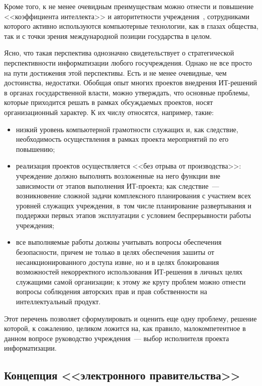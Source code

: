 \begin{multicols}{2}
Кроме того, к не менее очевидным преимуществам можно отнести и повышение
<<коэффициента интеллекта>> и авторитетности учреждения~\cite{1bos}, сотрудниками
которого активно используются компьютерные технологии, как в глазах общества, так и с
точки зрения международной позиции государства в целом.

Ясно, что такая перспектива однозначно свидетельствует о стратегической
перспективности информатизации любого госучреждения. Однако не все просто на пути
достижения этой перспективы. Есть и не менее очевидные, чем достоинства, недостатки.
Обобщая опыт многих проектов внедрения ИТ-решений в органах государственной
влас\-ти, можно утверждать, что основные проблемы, которые приходится решать в рамках
обсуждаемых проектов, носят организационный характер. К их числу относятся,
например, такие:
\begin{itemize}
\item низкий уровень компьютерной грамотности служащих и, как следствие,
необходимость осуществления в рамках проекта мероприятий по его повышению;
\item реализация проектов осуществляется <<без отрыва от производства>>:
учреждение должно выполнять возложенные на него функции вне зависимости от
этапов выполнения ИТ-проекта; как следствие~--- возникновение сложной задачи
комплексного планирования с участием всех уровней служащих учреждения, в~том
чис\-ле планирование развертывания и поддержки первых этапов эксплуатации с условием
бес\-пре\-рыв\-ности работы учреждения;
\item все выполняемые работы должны учитывать вопросы обеспечения безопасности,
причем не только в целях обеспечения зашиты от не\-санк\-ци\-о\-ни\-ро\-ван\-но\-го доступа
извне, но и в \mbox{целях} блокирования возможностей некорректного использования 
ИТ-ре\-ше\-ния в личных целях служащими самой организации; к этому же кругу проблем 
можно отнести вопросы соблюдения авторских прав и прав соб\-ст\-вен\-ности на 
интеллектуальный продукт.
\end{itemize}

Этот перечень позволяет сформулировать и оценить еще одну проблему, решение
которой, к сожа\-ле\-нию, целиком ложится на, как правило, малокомпетентное в данном
вопросе руководство учреж\-де\-ния~--- выбор исполнителя проекта информатизации.

\subsection{Концепция <<электронного правительства>>} %


\end{multicols}
